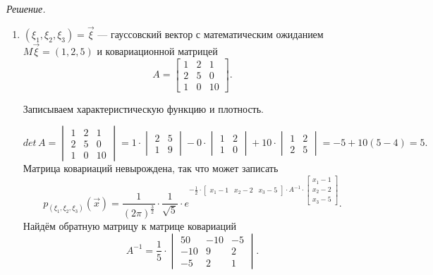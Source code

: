 \textit{Решение.}
\begin{enumerate}[label=\alph*)]
  \item $ \left( \xi_1, \xi_2, \xi_3 \right) = \vec{ \xi }$ ---
  гауссовский вектор с математическим ожиданием $M \vec{ \xi } = \left( 1, 2, 5 \right) $
  и ковариационной матрицей
  $$A =
    \begin{bmatrix}
      1 & 2 & 1 \\
      2 & 5 & 0 \\
      1 & 0 & 10
    \end{bmatrix}.$$

  Записываем характеристическую функцию и плотность.

  $$det \, A =
    \begin{vmatrix}
      1 & 2 & 1 \\
      2 & 5 & 0 \\
      1 & 0 & 10
    \end{vmatrix} =
    1 \cdot
    \begin{vmatrix}
      2 & 5 \\
      1 & 9
    \end{vmatrix} - 0 \cdot
    \begin{vmatrix}
      1 & 2 \\
      1 & 0
    \end{vmatrix} + 10 \cdot
    \begin{vmatrix}
      1 & 2 \\
      2 & 5
    \end{vmatrix} =
    -5 + 10 \left( 5 - 4 \right) =
    5.$$
  Матрица ковариаций невырождена, так что может записать
  $$p_{ \left( \xi_1, \xi_2, \xi_3 \right) } \left( \vec{x} \right) =
    \frac{1}{ \left( 2 \pi \right)^{ \frac{3}{2}}} \cdot \frac{1}{ \sqrt{5}} \cdot
    e^{- \frac{1}{2} \cdot
      \begin{bmatrix}
        x_1 - 1 & x_2 - 2 & x_3 - 5
      \end{bmatrix} \cdot A^{-1} \cdot
      \begin{bmatrix}
        x_1 - 1 \\
        x_2 - 2 \\
        x_3 - 5
      \end{bmatrix}}.$$
  Найдём обратную матрицу к матрице ковариаций
  $$A^{-1} =
    \frac{1}{5} \cdot
    \begin{vmatrix}
      50 & -10 & -5 \\
      -10 & 9 & 2 \\
      -5 & 2 & 1
    \end{vmatrix}.$$

\end{enumerate}
